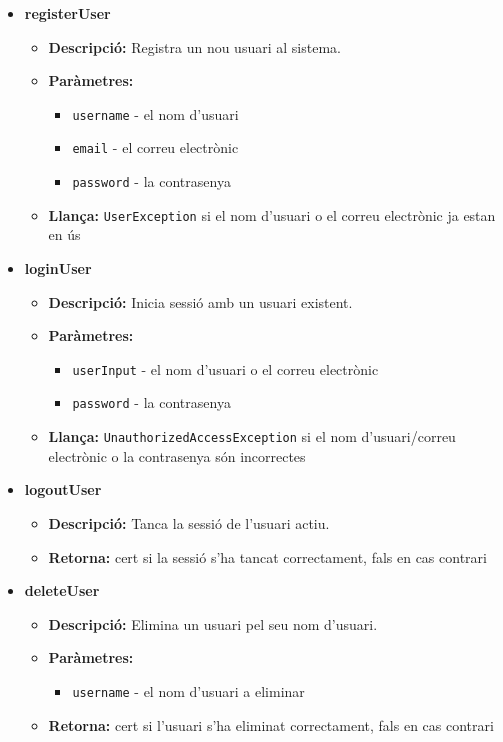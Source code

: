 \documentclass[a4paper, t]{article}
\begin{document}
\begin{itemize}
    \item \textbf{registerUser}
    \begin{itemize}
        \item \textbf{Descripció:} Registra un nou usuari al sistema.
        \item \textbf{Paràmetres:}
        \begin{itemize}
            \item \texttt{username} - el nom d'usuari
            \item \texttt{email} - el correu electrònic
            \item \texttt{password} - la contrasenya
        \end{itemize}
        \item \textbf{Llança:} \texttt{UserException} si el nom d'usuari o el correu electrònic ja estan en ús
    \end{itemize}

    \item \textbf{loginUser}
    \begin{itemize}
        \item \textbf{Descripció:} Inicia sessió amb un usuari existent.
        \item \textbf{Paràmetres:}
        \begin{itemize}
            \item \texttt{userInput} - el nom d'usuari o el correu electrònic
            \item \texttt{password} - la contrasenya
        \end{itemize}
        \item \textbf{Llança:} \texttt{UnauthorizedAccessException} si el nom d'usuari/correu electrònic o la contrasenya són incorrectes
    \end{itemize}

    \item \textbf{logoutUser}
    \begin{itemize}
        \item \textbf{Descripció:} Tanca la sessió de l'usuari actiu.
        \item \textbf{Retorna:} cert si la sessió s'ha tancat correctament, fals en cas contrari
    \end{itemize}

    \item \textbf{deleteUser}
    \begin{itemize}
        \item \textbf{Descripció:} Elimina un usuari pel seu nom d'usuari.
        \item \textbf{Paràmetres:}
        \begin{itemize}
            \item \texttt{username} - el nom d'usuari a eliminar
        \end{itemize}
        \item \textbf{Retorna:} cert si l'usuari s'ha eliminat correctament, fals en cas contrari
    \end{itemize}


\end{itemize}
\end{document}
